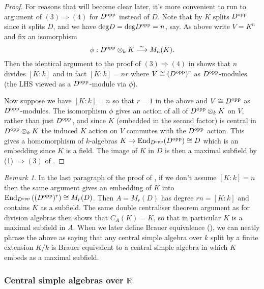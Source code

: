 \documentclass[11pt]{amsart}
\numberwithin{equation}{section}
\theoremstyle{remark}
\newtheorem{remark}[equation]{Remark}
\theoremstyle{remark}
\theoremstyle{remark}
\theoremstyle{definition}
\theoremstyle{definition}
\theoremstyle{definition}
\theoremstyle{definition}
\theoremstyle{definition}
\theoremstyle{definition}
\begin{document}
\begin{proof}
For reasons that will become clear later, it's more convenient to run to argument of  $(3)\Rightarrow (4)$ for $D^\textup{opp}$ instead of $D$. Note that by  $K$ splits $D^\textup{opp}$since it splits $D$, and we have $\textup{deg}D=\textup{deg}D^\textup{opp}=n$, say. 
As above write $V=K^n$ and fix  an isomorphism
\[\phi:D^\textup{opp}\otimes_k K\stackrel{\sim}{\longrightarrow} M_n(K).\]
Then the identical argument to the proof of $(3)\Rightarrow (4)$ in  shows that $n$ divides $[K:k]$ and in fact $[K:k]=nr$ where $V\cong (D^\textup{opp})^r$ as $D^\textup{opp}$-modules (the LHS viewed as a $D^\textup{opp}$-module via $\phi$).

Now suppose we have $[K:k]=n$ so that $r=1$ in the above and $V\cong D^\textup{opp}$ as $D^\textup{opp}$-modules. The isomorphism $\phi$ gives an action of all of $D^\textup{opp}\otimes_k K$ on $V$, rather than just $D^\textup{opp}$, and since $K$ (embedded in the second factor) is central in  $D^\textup{opp}\otimes_k K$ the induced $K$ action on $V$ commutes with the $D^\textup{opp}$ action. This gives a homomorphism of $k$-algebras $K\rightarrow \textup{End}_{D^{\textup{opp}}}(D^\textup{opp})\cong D$ which is an embedding since $K$ is a field. The image of $K$ in $D$ is then a maximal subfield by (1) $\Rightarrow (3)$ of .
\end{proof}

\begin{remark} \label{end of splitting discussion}
In the last paragraph of the proof of , if we don't assume $[K:k]=n$ then the same argument gives an embedding of $K$ into $\textup{End}_{D^{\textup{opp}}}\left((D^\textup{opp})^r\right)\cong M_r(D)$. Then $A=M_r(D)$ has degree $rn=[K:k]$ and contains $K$ as a subfield. The same double centraliser theorem argument as for division algebras then shows that $C_A(K)=K$, so that in particular $K$ is a maximal subfield in $A$. When we later define Brauer equivalence (), we can neatly phrase the above as saying that any central simple algebra over $k$ split by a finite extension $K/k$ is Brauer equivalent to a central simple algebra in which $K$ embeds as a maximal subfield. 
\end{remark}

\subsubsection{Central simple algebras over $\mathbb{R}$}
\end{document}
